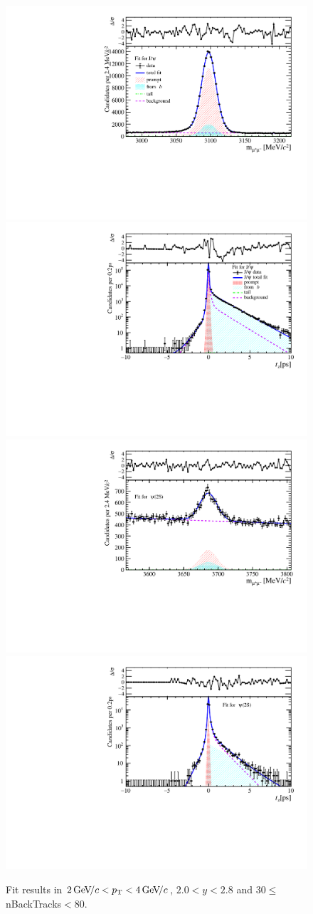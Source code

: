 \begin{figure}[H]
\begin{center}
\includegraphics[width=0.47\linewidth]{pdf/Jpsi/drawmassB/n5y1pt2.pdf}
\includegraphics[width=0.47\linewidth]{pdf/Jpsi/2DFitB/n5y1pt2.pdf}
\vspace*{-0.5cm}
\includegraphics[width=0.47\linewidth]{pdf/Psi2S/drawmassB/n5y1pt2.pdf}
\includegraphics[width=0.47\linewidth]{pdf/Psi2S/2DFitB/n5y1pt2.pdf}
\vspace*{-0.5cm}
\end{center}
\caption{Fit results in $2\text{\,Ge\kern -0.1em V\!/}c<p_{\mathrm{T}}<4\text{\,Ge\kern -0.1em V\!/}c$, $2.0<y<2.8$ and 30$\leq$nBackTracks$<$80.}
\label{Fitn5y1pt2}
\end{figure}
